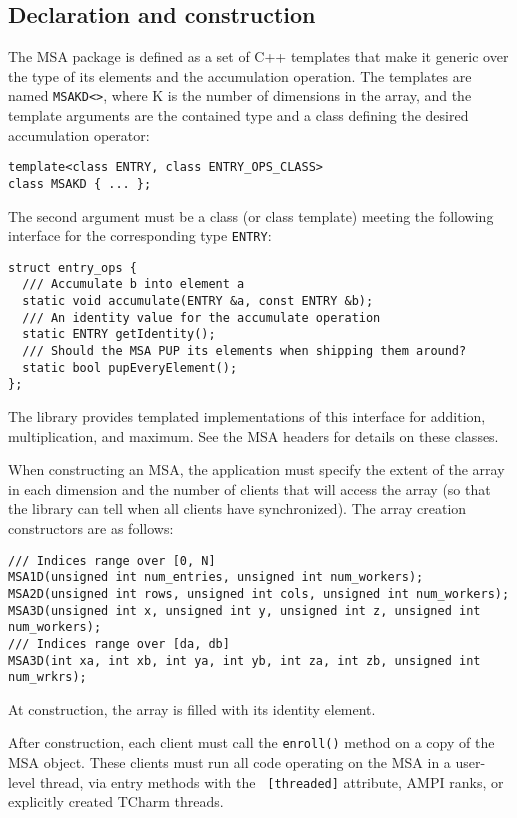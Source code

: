 \subsection{Declaration and construction}

The MSA package is defined as a set of C++ templates that make it
generic over the type of its elements and the accumulation operation.
The templates are named {\tt MSAKD<>}, where K is the number of
dimensions in the array, and the template arguments are the contained
type and a class defining the desired accumulation operator:

\begin{verbatim}
template<class ENTRY, class ENTRY_OPS_CLASS>
class MSAKD { ... };
\end{verbatim}

The second argument must be a class (or class template) meeting the
following interface for the corresponding type {\tt ENTRY}:
\begin{verbatim}
struct entry_ops {
  /// Accumulate b into element a
  static void accumulate(ENTRY &a, const ENTRY &b);
  /// An identity value for the accumulate operation
  static ENTRY getIdentity();
  /// Should the MSA PUP its elements when shipping them around?
  static bool pupEveryElement();
};
\end{verbatim}
The library provides templated implementations of this interface for
addition, multiplication, and maximum. See the MSA headers for details
on these classes.

When constructing an MSA, the application must specify the extent of
the array in each dimension and the number of clients that will access
the array (so that the library can tell when all clients have
synchronized). The array creation constructors are as follows:
\begin{verbatim}
/// Indices range over [0, N]
MSA1D(unsigned int num_entries, unsigned int num_workers);
MSA2D(unsigned int rows, unsigned int cols, unsigned int num_workers);
MSA3D(unsigned int x, unsigned int y, unsigned int z, unsigned int num_workers);
/// Indices range over [da, db]
MSA3D(int xa, int xb, int ya, int yb, int za, int zb, unsigned int num_wrkrs);
\end{verbatim}
At construction, the array is filled with its identity element.

After construction, each client must call the {\tt enroll()} method on
a copy of the MSA object. These clients must run all code operating on
the MSA in a user-level thread, via entry methods with the {\tt
  [threaded]} attribute, AMPI ranks, or explicitly created {\sc
  TCharm} threads.

